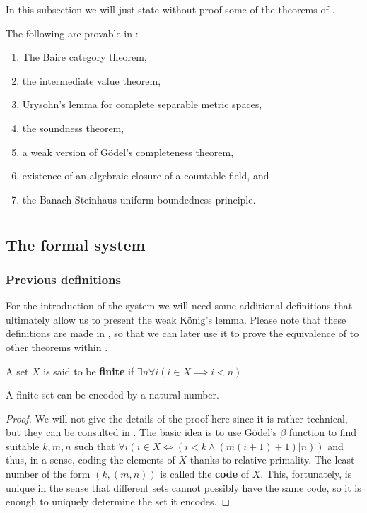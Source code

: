 \documentclass[../main.tex]{memoir}
\begin{document}
In this subsection we will just state without proof some of the theorems of \rca.

\begin{theorem}
  The following are provable in \rca:

  \begin{enumerate}
  \item The Baire category theorem,
  \item the intermediate value theorem,
  \item Urysohn's lemma for complete separable metric spaces,
  \item the soundness theorem,
  \item a weak version of Gödel's completeness theorem,
  \item existence of an algebraic closure of a countable field, and
  \item the Banach-Steinhaus uniform boundedness principle.
  \end{enumerate}
\end{theorem}

\section{\wkl}

\subsection{The formal system}

\subsubsection{Previous definitions}

For the introduction of the system \wkl we will need some additional definitions that ultimately allow us to present the weak König's lemma. Please note that these definitions are made in \rca, so that we can later use it to prove the equivalence of \wkl to other theorems within \rca.

\begin{definition}
  A set $X$ is said to be \textbf{finite} if $\exists n \forall i (i \in X \implies i < n)$
\end{definition}

\begin{theorem}
  A finite set can be encoded by a natural number.
\end{theorem}
\begin{proof}
  We will not give the details of the proof here since it is rather technical, but they can be consulted in \cite{simpson}. The basic idea is to use Gödel's $\beta$ function to find suitable $k, m, n$ such that $\forall i (i \in X \iff (i < k \land (m(i + 1) + 1) \vert n))$ and thus, in a sense, coding the elements of $X$ thanks to relative primality. The least number of the form $(k, (m, n))$ is called the \textbf{code} of $X$. This, fortunately, is unique in the sense that different sets cannot possibly have the same code, so it is enough to uniquely determine the set it encodes.
\end{proof}
\end{document}
